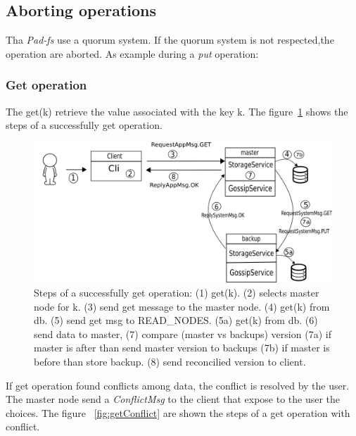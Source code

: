\subsection{Aborting operations}
Tha \emph{Pad-fs} use a quorum system. If the quorum system is not respected,the operation are aborted.
As example during a \emph{put} operation:
\begin{•}

\subsubsection*{Get operation}
The get(k) retrieve the value associated with the key k.
The figure~\ref{fig:get} shows the steps of a successfully get operation.

\begin{figure}[H]
\centering
\includegraphics[scale=0.5]{figures/get.png}
\caption{Steps of a successfully get operation: (1) get(k). (2) selects master node for k. (3) send get message to the master node. (4) get(k) from db. (5) send get msg to READ\_NODES. (5a) get(k) from db. (6) send data to master, (7) compare (master vs backups) version (7a) if master is after than send master version to backups (7b) if master is before than store backup. (8) send reconcilied version to client. }
\label{fig:get}
\end{figure}

If get operation found conflicts among data, the conflict is resolved by the user. The master node send a \textit{ConflictMsg} to the client that expose to the user the choices.
The figure ~\ref{fig:getConflict} are shown the steps of a get operation with conflict.


\end{•}
